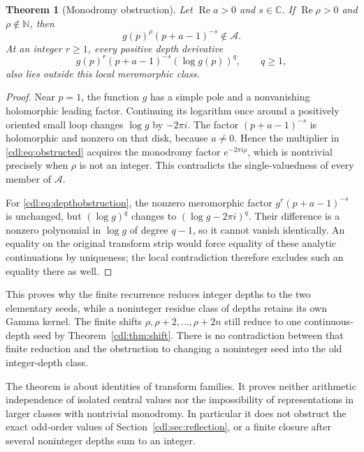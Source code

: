 \documentclass[11pt,letterpaper]{article}
\numberwithin{equation}{section}
\newtheorem{theorem}{Theorem}[section]
\theoremstyle{definition}\newtheorem{definition}[theorem]{Definition}
\theoremstyle{remark}\newtheorem{remark}[theorem]{Remark}
\newcommand{\C}{\mathbb C}\newcommand{\R}{\mathbb R}
\newcommand{\N}{\mathbb N}\newcommand{\Q}{\mathbb Q}
\newcommand{\Rea}{\operatorname{Re}}\newcommand{\Ima}{\operatorname{Im}}
\begin{document}
\begin{theorem}[Monodromy obstruction]\label{cdl:thm:obstruction}
Let $\Rea a>0$ and $s\in\C$. If $\Rea\rho>0$ and $\rho\notin\N$, then
\begin{equation}\label{cdl:eq:obstructed}
 g(p)^\rho(p+a-1)^{-s}\notin\mathscr A.
\end{equation}
At an integer $r\ge1$, every positive depth derivative
\begin{equation}\label{cdl:eq:depthobstruction}
 g(p)^r(p+a-1)^{-s}(\log g(p))^q,\qquad q\ge1,
\end{equation}
also lies outside this local meromorphic class.
\end{theorem}
\begin{proof}
Near $p=1$, the function $g$ has a simple pole and a nonvanishing
holomorphic leading factor. Continuing its logarithm once around a
positively oriented small loop changes $\log g$ by $-2\pi i$.
The factor $(p+a-1)^{-s}$ is holomorphic and nonzero on that disk,
because $a\ne0$. Hence the multiplier in \eqref{cdl:eq:obstructed}
acquires the monodromy factor $e^{-2\pi i\rho}$, which is nontrivial
precisely when $\rho$ is not an integer. This contradicts the
single-valuedness of every member of $\mathscr A$.

For \eqref{cdl:eq:depthobstruction}, the nonzero meromorphic factor
$g^r(p+a-1)^{-s}$ is unchanged, but $(\log g)^q$ changes to
$(\log g-2\pi i)^q$. Their difference is a nonzero polynomial in
$\log g$ of degree $q-1$, so it cannot vanish identically.
An equality on the original transform strip would force equality of
these analytic continuations by uniqueness; the local contradiction
therefore excludes such an equality there as well.
\end{proof}

This proves why the finite recurrence reduces integer depths to the two
elementary seeds, while a noninteger residue class of depths retains
its own Gamma kernel. The finite shifts
$\rho,\rho+2,\ldots,\rho+2n$ still reduce to one continuous-depth seed
by Theorem~\ref{cdl:thm:shift}. There is no contradiction between that
finite reduction and the obstruction to changing a noninteger seed
into the old integer-depth class.

The theorem is about identities of transform families. It proves neither
arithmetic independence of isolated central values nor the impossibility
of representations in larger classes with nontrivial monodromy. In
particular it does not obstruct the exact odd-order values of
Section~\ref{cdl:sec:reflection}, or a finite closure after several
noninteger depths sum to an integer.
\end{document}
